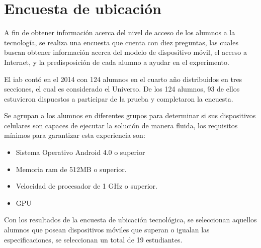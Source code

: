 
\section{Encuesta de ubicación}
\label{sec:ubicacion}

A fin de obtener información acerca del nivel de acceso  de los alumnos a la
tecnología, se realiza una encuesta que cuenta con diez preguntas, las cuales
buscan obtener información acerca del modelo de dispositivo móvil, el acceso a
Internet, y la predisposición de cada alumno a ayudar en el experimento.

El \Gls{iab} contó en
el 2014 con 124 alumnos en el cuarto año distribuidos en tres secciones, el cual es considerado
el Universo. De los 124 alumnos, 93 de ellos estuvieron dispuestos a participar de la prueba
y completaron la encuesta.

Se agrupan a los alumnos en diferentes grupos para determinar si sus
dispositivos celulares son capaces de ejecutar la solución de manera fluida, los
requisitos mínimos para garantizar esta experiencia son:

\begin{itemize}
    \item Sistema Operativo Android 4.0 o superior
    \item Memoria ram de 512MB o superior.
    \item Velocidad de procesador de 1 GHz o superior.
    \item GPU 
\end{itemize}

Con los resultados de la encuesta de ubicación tecnológica, se seleccionan
aquellos alumnos que posean dispositivos móviles que superan o igualan las
especificaciones, se seleccionan un total de 19 estudiantes.

